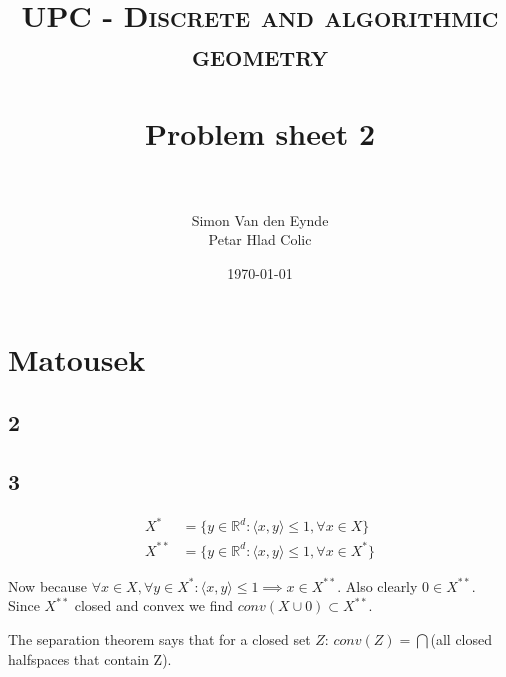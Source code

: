 \documentclass[paper=a4, fontsize=11pt]{scrartcl} %
\title{	
\normalfont \normalsize 
\textsc{UPC - Discrete and algorithmic geometry} \\ [25pt] %
\horrule{0.5pt} \\[0.4cm] %
\huge Problem sheet 2  \\ %
\horrule{2pt} \\[0.5cm] %
}
\author{Simon Van den Eynde \\ Petar Hlad Colic} %
\date{\normalsize\today} %
\theoremstyle{plain}
\begin{document}
\maketitle %

\section{Matousek}
\subsection{2}
\subsection{3}
\begin{align*}
X^{*} &= \{y\in \mathbb{R}^{d} : \langle x,y\rangle \leq 1, \forall x \in X\}\\
X^{**} &= \{y\in \mathbb{R}^{d} : \langle x,y\rangle \leq 1, \forall x \in X^{*}\}
\end{align*}
 
Now because $\forall x\in X,\forall y \in X^{*} : \langle x,y\rangle \leq 1 \implies x\in X^{**}$. Also clearly $0\in X^{**}$. Since $X^{**}$ closed and convex we find $conv(X\cup 0)\subset X^{**}$.

The separation theorem says that for a closed set $Z$: $conv(Z)=\bigcap$(all closed halfspaces that contain Z).
\end{document}
